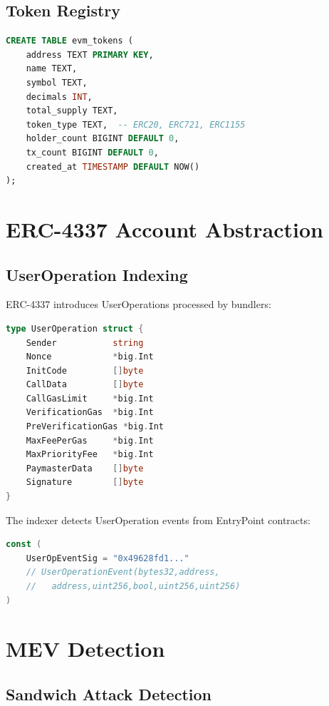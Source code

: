 \documentclass[11pt,twocolumn]{article}
\begin{document}
\subsection{Token Registry}

\begin{lstlisting}[language=SQL,caption={Token schema}]
CREATE TABLE evm_tokens (
    address TEXT PRIMARY KEY,
    name TEXT,
    symbol TEXT,
    decimals INT,
    total_supply TEXT,
    token_type TEXT,  -- ERC20, ERC721, ERC1155
    holder_count BIGINT DEFAULT 0,
    tx_count BIGINT DEFAULT 0,
    created_at TIMESTAMP DEFAULT NOW()
);
\end{lstlisting}

\section{ERC-4337 Account Abstraction}

\subsection{UserOperation Indexing}

ERC-4337 introduces UserOperations processed by bundlers:

\begin{lstlisting}[language=Go,caption={UserOperation structure}]
type UserOperation struct {
    Sender           string
    Nonce            *big.Int
    InitCode         []byte
    CallData         []byte
    CallGasLimit     *big.Int
    VerificationGas  *big.Int
    PreVerificationGas *big.Int
    MaxFeePerGas     *big.Int
    MaxPriorityFee   *big.Int
    PaymasterData    []byte
    Signature        []byte
}
\end{lstlisting}

The indexer detects UserOperation events from EntryPoint contracts:

\begin{lstlisting}[language=Go,caption={ERC-4337 event signatures}]
const (
    UserOpEventSig = "0x49628fd1..."
    // UserOperationEvent(bytes32,address,
    //   address,uint256,bool,uint256,uint256)
)
\end{lstlisting}

\section{MEV Detection}

\subsection{Sandwich Attack Detection}
\end{document}
